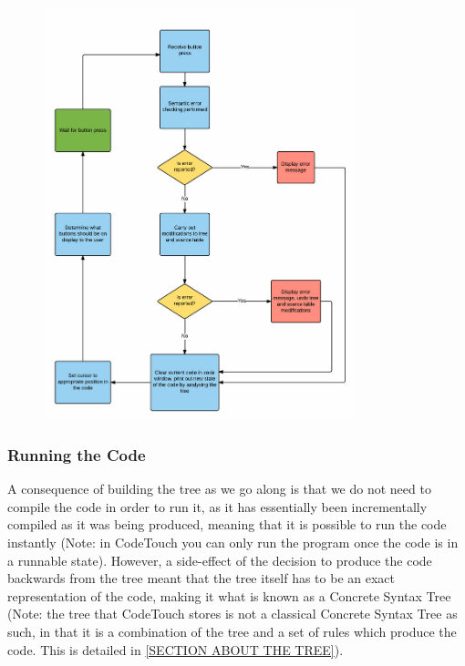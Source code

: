\documentclass[ %
                    author={Jonathan Rankin},
                supervisor={Dr. David May, Dr. Ian Holyer},
                    degree={MEng},
                     title={CodeTouch},
                  subtitle={A Revolutionary Way To Program Real Code On Touch Screen Devices},
                      type={enterprise},
                      year={2015 } ]{dissertation}
\begin{document}
\begin{figure}[!h]
\centering
\includegraphics[width=0.80\textwidth]{process}
\caption{}
\label{fig:processes}
\end{figure}



\subsubsection{Running the Code}

A consequence of building the tree as we go along is that we do not need to compile the code in order to run it, as it has essentially been incrementally compiled as it was being produced, meaning that it is possible to run the code instantly (Note: in CodeTouch you can only run the program once the code is in a runnable state). However, a side-effect of the decision to produce the code backwards from the tree meant that the tree itself has to be an exact representation of the code, making it what is known as a Concrete Syntax Tree (Note: the tree that CodeTouch stores is not a classical Concrete Syntax Tree as such, in that it is a combination of the tree and a set of rules which produce the code. This is detailed in \ref{SECTION ABOUT THE TREE}).
\end{document}
